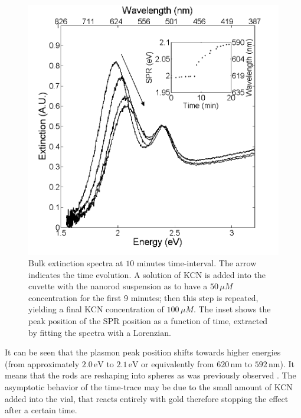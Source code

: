 \documentclass[twocolumn]{article}
\begin{document}
\begin{figure}[htbp]
 \centering 
 \includegraphics[width=0.95\linewidth]{plasmon_bulk.png}
 \caption{Bulk extinction spectra at $10$ minutes time-interval. The arrow
 indicates the time evolution. A solution of KCN is added into the cuvette with
 the nanorod suspension as to have a $50\,\mu M$ concentration for the first 9
 minutes; then this step is repeated, yielding a final KCN concentration of
 $100\, \mu M$. The inset shows the peak position of the SPR position as a
 function of time, extracted by fitting the spectra with a Lorenzian.  }
 \label{fig:bulk}
\end{figure}

It can be seen that the plasmon peak position shifts towards higher energies
(from approximately $2.0\,\textrm{eV}$ to $2.1\,\textrm{eV}$ or equivalently
from $620\,\textrm{nm}$ to $592\,\textrm{nm}$). It means that the rods are
reshaping into spheres as was previously observed \cite{Jana2002}. The
asymptotic behavior of the time-trace may be due to the small amount of KCN
added into the vial, that reacts entirely with gold therefore stopping the
effect after a certain time.
\end{document}
